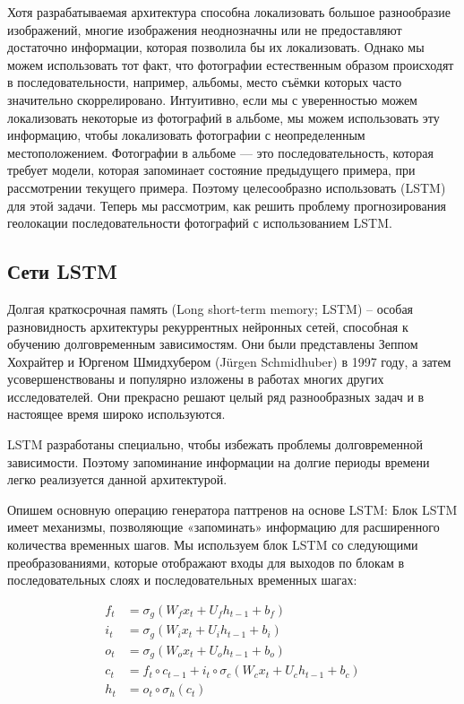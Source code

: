 Хотя разрабатываемая архитектура способна локализовать большое разнообразие изображений, многие изображения неоднозначны или не предоставляют достаточно информации, которая позволила бы их локализовать.
Однако мы можем использовать тот факт, что фотографии естественным образом происходят в последовательности, например, альбомы, место съёмки которых часто значительно скоррелировано. Интуитивно, если мы с уверенностью можем локализовать
некоторые из фотографий в альбоме, мы можем использовать эту информацию,
чтобы локализовать фотографии с неопределенным местоположением. Фотографии в альбоме --- это последовательность,
которая требует модели, которая запоминает состояние предыдущего примера, 
при рассмотрении текущего примера. Поэтому целесообразно использовать
(LSTM) \cite{hochreiter1997long} для этой задачи.
Теперь мы рассмотрим, как решить проблему прогнозирования
геолокации последовательности фотографий с использованием LSTM.


\subsection{Сети LSTM}

Долгая краткосрочная память (Long short-term memory; LSTM) – особая разновидность архитектуры рекуррентных нейронных сетей, способная к обучению долговременным зависимостям. Они были представлены Зеппом Хохрайтер и Юргеном Шмидхубером (Jürgen Schmidhuber)\cite{hochreiter1997long} в 1997 году, а затем усовершенствованы и популярно изложены в работах многих других исследователей. Они прекрасно решают целый ряд разнообразных задач и в настоящее время широко используются.

LSTM разработаны специально, чтобы избежать проблемы долговременной зависимости. Поэтому запоминание информации на долгие периоды времени легко реализуется данной архитектурой.

Опишем основную операцию генератора паттренов на основе LSTM\cite{gers1999learning}:
Блок LSTM имеет механизмы, позволяющие «запоминать» информацию для расширенного количества временных шагов. Мы используем блок LSTM со следующими преобразованиями, которые отображают входы для выходов по блокам в последовательных слоях и последовательных временных шагах:

\[
{\displaystyle {\begin{aligned}
	f_{t} & =\sigma _{g}(W_{f}x_{t}+U_{f}h_{t-1}+b_{f})                               \\
	i_{t} & =\sigma _{g}(W_{i}x_{t}+U_{i}h_{t-1}+b_{i})                               \\
	o_{t} & =\sigma _{g}(W_{o}x_{t}+U_{o}h_{t-1}+b_{o})                               \\
	c_{t} & =f_{t}\circ c_{t-1}+i_{t}\circ \sigma _{c}(W_{c}x_{t}+U_{c}h_{t-1}+b_{c}) \\
	h_{t} & =o_{t}\circ \sigma _{h}(c_{t})
\end{aligned}}}
\]

